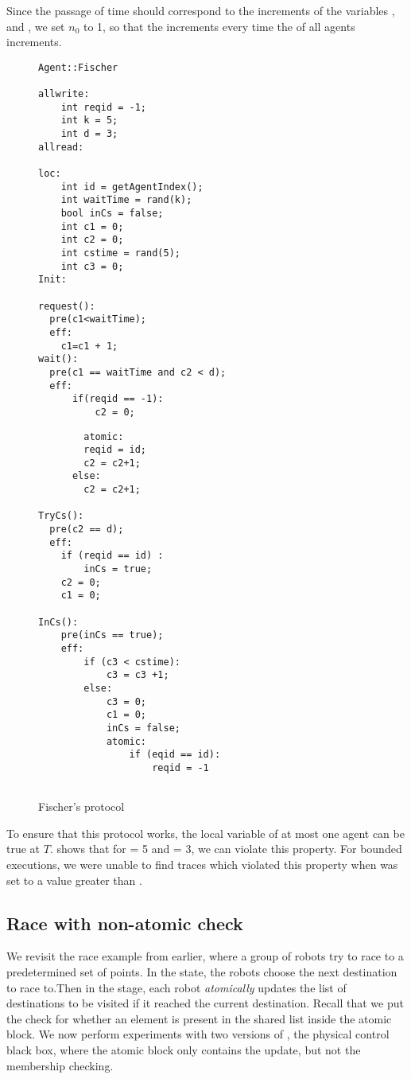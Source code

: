 Since the passage of time should correspond to the increments of the variables , and , we set $n_0$ to 1, so that the  increments every time the  of all agents increments.  
\begin{figure}[ht!]
\label{fig:fish}
\noindent\begin{minipage}{.5\textwidth}

\begin{lstlisting}
Agent::Fischer

allwrite:
	int reqid = -1; 
    int k = 5;
    int d = 3;
allread:

loc:
	int id = getAgentIndex();
	int waitTime = rand(k); 
    bool inCs = false;
    int c1 = 0;
    int c2 = 0;
	int cstime = rand(5);
    int c3 = 0;
Init:

request():
  pre(c1<waitTime);
  eff:
  	c1=c1 + 1;
wait():
  pre(c1 == waitTime and c2 < d);
  eff:
      if(reqid == -1):
          c2 = 0;
 \end{lstlisting}
 \end{minipage}\hfill
\noindent\begin{minipage}{.5\textwidth}

\begin{lstlisting}
 		atomic:
        reqid = id;
        c2 = c2+1;  
      else:
      	c2 = c2+1;

TryCs():
  pre(c2 == d);
  eff:
    if (reqid == id) :
    	inCs = true;
    c2 = 0;
    c1 = 0;

InCs():
	pre(inCs == true);
    eff:
    	if (c3 < cstime):
        	c3 = c3 +1;
        else:
        	c3 = 0;
            c1 = 0;
            inCs = false;
            atomic:
        		if (eqid == id):
                	reqid = -1
   

 \end{lstlisting}
 \end{minipage}\hfill
 \caption{Fischer's  protocol}
 \end{figure}
 To ensure that this protocol works, the local  variable of at most one agent can be true at  $T$.  shows that for  = 5 and  = 3, we can violate this property. For bounded executions, we were unable to find traces which violated this property when  was set to a value greater than . 
 
\subsection{Race with non-atomic check}
We revisit the race example from earlier, where a group of robots try to race to a predetermined set of points. In the  state, the robots choose the next destination to race to.Then in the  stage, each robot \emph{atomically} updates the list of destinations to be visited if it reached the current destination. Recall that we put the check for whether an element is present in the shared list  inside the atomic block. We now perform experiments with two versions of , the physical control black box, where the atomic block only contains the update, but not the membership checking.  

